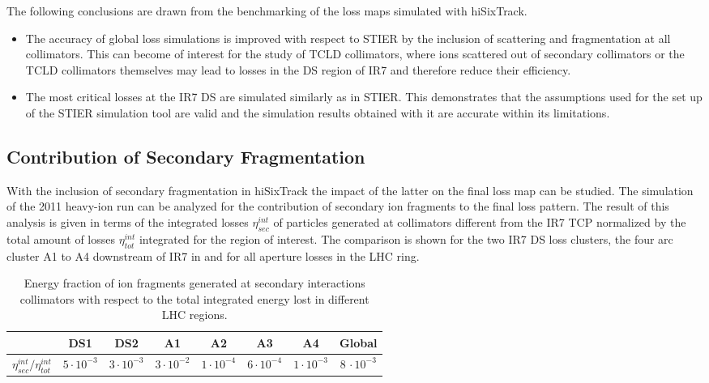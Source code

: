 The following conclusions are drawn from the benchmarking of the loss maps simulated with hiSixTrack. 

\begin{itemize}
  \item The accuracy of global loss simulations is improved with respect to STIER by the inclusion of scattering and fragmentation at all collimators. This can become of interest for the study of TCLD collimators, where ions scattered out of secondary collimators or the TCLD collimators themselves may lead to losses in the DS region of IR7 and therefore reduce their efficiency. 
  \item The most critical losses at the IR7 DS are simulated similarly as in STIER. This demonstrates that the assumptions used for the set up of the STIER simulation tool are valid and the simulation results obtained with it are accurate within its limitations. 
\end{itemize}




\subsection{Contribution of Secondary Fragmentation}

With the inclusion of secondary fragmentation in hiSixTrack the impact of the latter on the final loss map can be studied. The simulation of the 2011 heavy-ion run can be analyzed for the contribution of secondary ion fragments to the final loss pattern. The result of this analysis is given in terms of the integrated losses $\eta_{sec}^{int}$ of particles generated at collimators different from the IR7 TCP normalized by the total amount of losses $\eta_{tot}^{int}$ integrated for the region of interest. The comparison is shown for the two IR7 DS loss clusters, the four arc cluster A1 to A4 downstream of IR7 in  and for all aperture losses in the LHC ring. 
%
\begin{table}[b]
\centering
\caption{Energy fraction of ion fragments generated at secondary interactions collimators with respect to the total integrated energy lost in different LHC regions. }
\label{tab:secondary}
\begin{tabular}{cccccccc}
                                \toprule                                             & DS1              & DS2              & A1                 & A2                & A3                & A4              & Global \\ \midrule
$\eta_{sec}^{int}/\eta^{int}_{tot}$& $5\cdot 10^{-3}$ & $3\cdot 10^{-3}$ & $3\cdot 10^{-2}$ & $1 \cdot 10^{-4}$ & $6 \cdot 10^{-4}$ & $1\cdot10^{-3}$ & $8\,\cdot10^{-3}$  \\ \bottomrule
\end{tabular}
\end{table}
%

